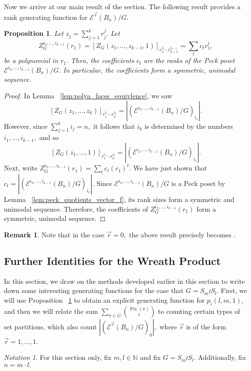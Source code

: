 \documentclass[10 pt]{amsart}
\theoremstyle{plain}
\newtheorem{prop}[thm]{Proposition}
\theoremstyle{definition}
\newtheorem{rem}[thm]{Remark}
\theoremstyle{remark}
\newtheorem{note}[thm]{Notation}
\numberwithin{equation}{section}
\newcommand\ssec{\subsection}
\newcommand\BN{{\mathbb N}}
\renewcommand{\vec}[1]{\overrightarrow{#1}}
\def\Fix{\operatorname{Fix}}
\begin{document}
Now we arrive at our main result of the section. The following result provides a rank generating function for $\mathcal E^{\vec r}(B_n)/G.$

\begin{prop}
\label{prop:rank_gen_fn}
Let $z_j = \sum_{j = 1}^k r_j^j.$ Let $$Z_G^{i_2,\ldots,i_{k-1}}(r_1) =[Z_G(z_1,\ldots, z_{k-1},1)]_{r_2^{i_2}\cdots r_{k-1}^{i_{k-1}}}= \sum_{t}^{}c_tr_1^t,$$ be a polynomial in $r_1.$ Then, the coefficients $c_t$  are the ranks of the Peck poset \linebreak
$\mathcal E^{i_2,\ldots, i_{k-1}}(B_n)/G.$ In particular, the coefficients form a symmetric, unimodal sequence.
\end{prop}
\begin{proof}
In Lemma ~\ref{lem:polya_faces_equivlence}, we saw $$[Z_G(z_1,\ldots, z_k)]_{r_1^{i_1} \cdots r_k^{i_k}}=|(\mathcal E^{i_2,\ldots, i_{k-1}}(B_n)/G)_{i_1}|.$$
However, since $\sum_{j = 1}^k i_j = n,$ it follows that $i_k$ is determined by the numbers $i_1,\ldots, i_{k-1},$ and so 
$$[Z_G(z_1,\ldots, 1)]_{r_1^{i_1} \cdots r_k^{i_k}}=|(\mathcal E^{i_2,\ldots, i_{k-1}}(B_n)/G)_{i_1}|.$$
Next, write $Z_G^{i_2,\ldots,i_{k-1}}(r_1) = \sum_{t} c_t (r_1)^t.$ We have just shown that $c_t = |(\mathcal E^{i_2,\ldots, i_{k-1}}(B_n)/G)_{i_1}|.$ Since $\mathcal E^{i_2,\ldots, i_{k-1}}(B_n)/G$ is a Peck poset by Lemma ~\ref{lem:peck_quotients_vector_f}, its rank sizes form a symmetric and unimodal sequence. Therefore, the coefficients of $Z_G^{i_2,\ldots,i_{k-1}}(r_1)$ form a symmetric, unimodal sequence.
\end{proof}

\begin{rem}
Note that in the case $\vec r = 0,$ the above result precisely becomes \cite[Corollary 7.16]{algebraic_stanley}.
\end{rem}

\ssec{Further Identities for the Wreath Product}
In this section, we draw on the methods developed earlier in this section to write down some interesting generating functions for the case that $G = S_m \wr S_l.$
First, we will use Proposition ~\ref{prop:rank_gen_fn} to obtain an explicit generating function for $p_i(l,m,1),$ and then we will relate the sum $\sum_{\pi \in G} \binom{\Fix(\pi)}{t}$ to counting certain types of set partitions, which also count $|(\mathcal E^{\vec r}(B_n)/G)_0|,$ where $\vec r$ is of the form $\vec r = 1,\ldots, 1$.

\begin{note}
For this section only, fix $m,l \in \BN$ and fix $G = S_m \wr S_l.$ Additionally, fix $n = m \cdot l.$
\end{note}
\end{document}
